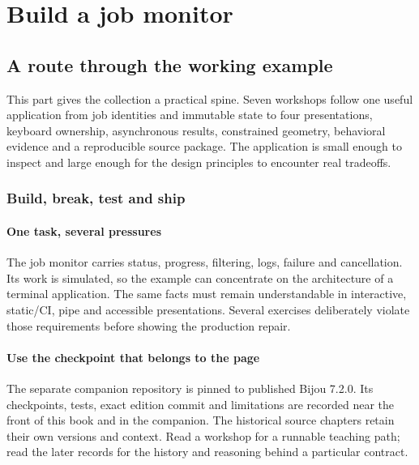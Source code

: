 \part{Build a job monitor}\label{part-workshops}
\chapter*{A route through the working example}

This part gives the collection a practical spine. Seven workshops follow one useful application from job identities and immutable state to four presentations, keyboard ownership, asynchronous results, constrained geometry, behavioral evidence and a reproducible source package. The application is small enough to inspect and large enough for the design principles to encounter real tradeoffs.

\section*{Build, break, test and ship}
\subsection*{One task, several pressures}

The job monitor carries status, progress, filtering, logs, failure and cancellation. Its work is simulated, so the example can concentrate on the architecture of a terminal application. The same facts must remain understandable in interactive, static/CI, pipe and accessible presentations. Several exercises deliberately violate those requirements before showing the production repair.

\subsection*{Use the checkpoint that belongs to the page}

The separate companion repository is pinned to published Bijou 7.2.0. Its checkpoints, tests, exact edition commit and limitations are recorded near the front of this book and in the companion. The historical source chapters retain their own versions and context. Read a workshop for a runnable teaching path; read the later records for the history and reasoning behind a particular contract.

%
%
%
%
%
%
%
